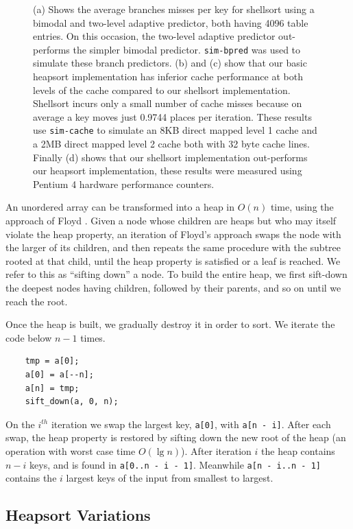 \documentclass[acmtocl]{acmtrans2m}
\begin{document}
\begin{figure}
\caption{(a) Shows the average branches misses per key for shellsort using a
bimodal and two-level adaptive predictor, both having 4096 table entries.  On
this occasion, the two-level adaptive predictor out-performs the simpler bimodal
predictor. \texttt{sim-bpred} was used to simulate these branch predictors.  (b)
and (c) show that our basic heapsort implementation has inferior cache
performance at both levels of the cache compared to our shellsort
implementation. Shellsort incurs only a small number of cache misses because on
average a key moves just 0.9744 places per iteration. These results use
\texttt{sim-cache} to simulate an 8KB direct mapped level 1 cache and a 2MB
direct mapped level 2 cache both with 32 byte cache lines. Finally (d) shows
that our shellsort implementation out-performs our heapsort implementation,
these results were measured using Pentium 4 hardware performance counters.}
\label{shellsort_results_figs}
\end{figure}


An unordered array can be transformed into a heap in $O(n)$ time, using the
approach of Floyd \citeyear{Floyd64}.  Given a node whose children are heaps but
who may itself violate the heap property, an iteration of Floyd's approach swaps
the node with the larger of its children, and then repeats the same procedure
with the subtree rooted at that child, until the heap property is satisfied or a
leaf is reached. We refer to this as ``sifting down'' a node.  To build the
entire heap, we first sift-down the deepest nodes having children, followed by
their parents, and so on until we reach the root.

Once the heap is built, we gradually destroy it in order to sort. We iterate the
code below $n - 1$ times. 

\begin{verbatim}
    tmp = a[0];
    a[0] = a[--n];
    a[n] = tmp;    
    sift_down(a, 0, n);
\end{verbatim}

\noindent On the $i^{th}$ iteration we swap the largest key, \texttt{a[0]}, with
\texttt{a[n - i]}.  After each swap, the heap property is restored by sifting
down the new root of the heap (an operation with worst case time $O(\lg n)$).
After iteration $i$ the heap contains $n - i$ keys, and is found in
\texttt{a[0..n - i - 1]}. Meanwhile \texttt{a[n - i..n - 1]} contains the $i$
largest keys of the input from smallest to largest.

\subsection{Heapsort Variations}
\end{document}
